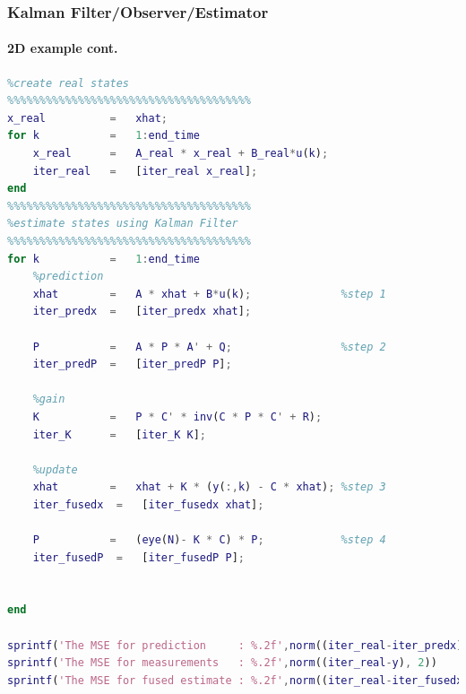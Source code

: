 \begin{frame}[fragile]\pw\Large
\frametitle{Kalman Filter/Observer/Estimator}
\framesubtitle{2D example \tiny cont.}

\tinyvvv \begin{lstlisting}[language=Matlab]
%%%%%%%%%%%%%%%%%%%%%%%%%%%%%%%%%%%%%%
%create real states
%%%%%%%%%%%%%%%%%%%%%%%%%%%%%%%%%%%%%%
x_real          =   xhat;
for k           =   1:end_time
    x_real      =   A_real * x_real + B_real*u(k);
    iter_real   =   [iter_real x_real]; 
end
%%%%%%%%%%%%%%%%%%%%%%%%%%%%%%%%%%%%%%
%estimate states using Kalman Filter
%%%%%%%%%%%%%%%%%%%%%%%%%%%%%%%%%%%%%%
for k           =   1:end_time
    %prediction
    xhat        =   A * xhat + B*u(k);              %step 1
    iter_predx  =   [iter_predx xhat];      
    
    P           =   A * P * A' + Q;                 %step 2
    iter_predP  =   [iter_predP P];      
    
    %gain
    K           =   P * C' * inv(C * P * C' + R);   
    iter_K      =   [iter_K K];         
    
    %update
    xhat        =   xhat + K * (y(:,k) - C * xhat); %step 3          
    iter_fusedx  =   [iter_fusedx xhat];
    
    P           =   (eye(N)- K * C) * P;            %step 4
    iter_fusedP  =   [iter_fusedP P];      

    
end

sprintf('The MSE for prediction     : %.2f',norm((iter_real-iter_predx), 2))
sprintf('The MSE for measurements   : %.2f',norm((iter_real-y), 2))
sprintf('The MSE for fused estimate : %.2f',norm((iter_real-iter_fusedx), 2))
\end{lstlisting}
\end{frame}



